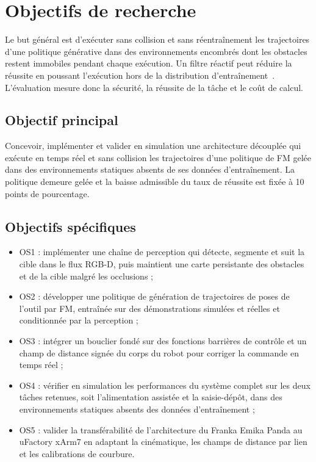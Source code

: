 \section{Objectifs de recherche}\label{sec:objectifs}
Le but général est d'exécuter sans collision et sans réentraînement les trajectoires d'une politique générative dans des environnements encombrés dont les obstacles restent immobiles pendant chaque exécution. Un filtre réactif peut réduire la réussite en poussant l'exécution hors de la distribution d'entraînement~\cite{Rmer2026From}. L'évaluation mesure donc la sécurité, la réussite de la tâche et le coût de calcul.

\subsection{Objectif principal}
Concevoir, implémenter et valider en simulation une architecture découplée qui exécute en temps réel et sans collision les trajectoires d'une politique de \ac{FM} gelée dans des environnements statiques absents de ses données d'entraînement. La politique demeure gelée et la baisse admissible du taux de réussite est fixée à 10 points de pourcentage.

\subsection{Objectifs spécifiques}
\begin{itemize}
    \item \acs{OS}1 : implémenter une chaîne de perception qui détecte, segmente et suit la cible dans le flux \ac{RGB-D}, puis maintient une carte persistante des obstacles et de la cible malgré les occlusions ;
    \item \acs{OS}2 : développer une politique de génération de trajectoires de poses de l'outil par \ac{FM}, entraînée sur des démonstrations simulées et réelles et conditionnée par la perception ;
    \item \acs{OS}3 : intégrer un bouclier fondé sur des fonctions barrières de contrôle et un champ de distance signée du corps du robot pour corriger la commande en temps réel ;
    \item \acs{OS}4 : vérifier en simulation les performances du système complet sur les deux tâches retenues, soit l'alimentation assistée et la saisie-dépôt, dans des environnements statiques absents des données d'entraînement ;
    \item \acs{OS}5 : valider la transférabilité de l'architecture du Franka Emika Panda au uFactory xArm7 en adaptant la cinématique, les champs de distance par lien et les calibrations de courbure.
\end{itemize}

